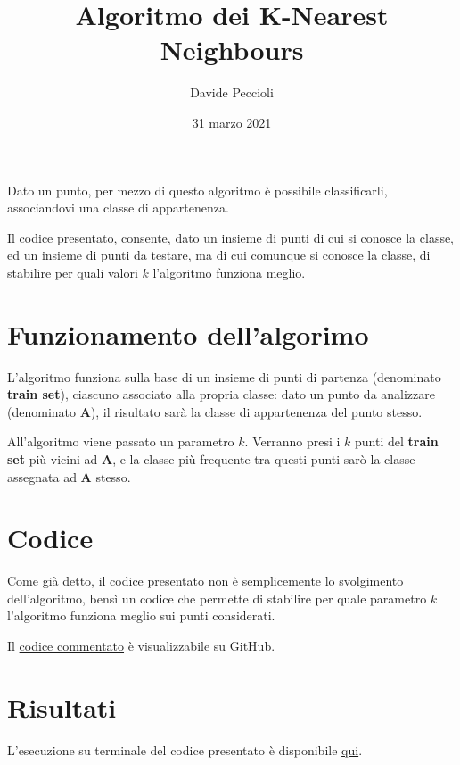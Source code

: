 \documentclass[a4paper]{article}
\title{Algoritmo dei K-Nearest Neighbours}
\date{31 marzo 2021}
\author{Davide Peccioli}
\begin{document}
\maketitle

Dato un punto, per mezzo di questo algoritmo è possibile classificarli, associandovi una classe di appartenenza.

Il codice presentato, consente, dato un insieme di punti di cui si conosce la classe, ed un insieme di punti da testare, ma di cui comunque si conosce la classe, di stabilire per quali valori $k$ l'algoritmo funziona meglio.

\section{Funzionamento dell'algorimo}

L'algoritmo funziona sulla base di un insieme di punti di partenza (denominato \textbf{train set}), ciascuno associato alla propria classe: dato un punto da analizzare (denominato \textbf{A}), il risultato sarà la classe di appartenenza del punto stesso.

All'algoritmo viene passato un parametro $k$. Verranno presi i $k$ punti del \textbf{train set} più vicini ad \textbf{A}, e la classe più frequente tra questi punti sarò la classe assegnata ad \textbf{A} stesso.

\section{Codice}

Come già detto, il codice presentato non è semplicemente lo svolgimento dell'algoritmo, bensì un codice che permette di stabilire per quale parametro $k$ l'algoritmo funziona meglio sui punti considerati.

Il \href{https://github.com/DavideP02/Octave_KNN_Peccioli5H/blob/main/KNN.m}{codice commentato} è visualizzabile su GitHub.

\section{Risultati}

L'esecuzione su terminale del codice presentato è disponibile \href{https://youtu.be/Dq0btd1xUEI}{qui}.
\end{document}
